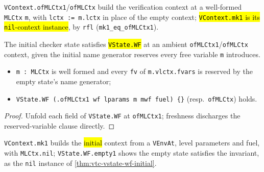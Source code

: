 \begin{definition}
  \label{def:vtc-vcontext-ofmlctx}
  \leanok

   \texttt{VContext.ofMLCtx1}/\texttt{ofMLCtx} build the verification context at a
  well-formed \texttt{MLCtx} \texttt{m}, with \texttt{lctx := m.lctx} in place of the empty
  context; \hl{\texttt{VContext.mk1} is its \texttt{nil}-context instance}, by \texttt{rfl}
  (\texttt{mk1\_eq\_ofMLCtx1}).
\end{definition}

\begin{lemma}
  \label{thm:vtc-vstate-wf-initial}
  \leanok

   The initial checker state satisfies \hl{\texttt{VState.WF}} at an ambient
  \texttt{ofMLCtx1}/\texttt{ofMLCtx} context, given the initial name generator reserves every
  free variable \texttt{m} introduces.
  \begin{itemize}
  \item {} \texttt{m : MLCtx} is well formed and every \texttt{fv} of
    \texttt{m.vlctx.fvars} is reserved by the empty state's name generator;
  \item {} \texttt{VState.WF (.ofMLCtx1 wf lparams m mwf fuel) \{\}} (resp.\
    \texttt{ofMLCtx}) holds.
  \end{itemize}
\end{lemma}
\begin{proof}
  \leanok
   Unfold each field of \texttt{VState.WF} at \texttt{ofMLCtx1}; freshness discharges
  the reserved-variable clause directly.
\end{proof}

\begin{definition}
  \label{def:vtc-vcontext-mk}
  \leanok
  \contrib{mixed}\srcloc{Lean4Lean/Verify/TypeChecker.lean}{64}

   \texttt{VContext.mk1} builds the \hl{initial} context from a \texttt{VEnvAt},
  level parameters and fuel, with \texttt{MLCtx.nil}; \texttt{VState.WF.empty1} shows the empty
  state satisfies the invariant, as the \texttt{nil} instance of
  \ref{thm:vtc-vstate-wf-initial}.
\end{definition}

